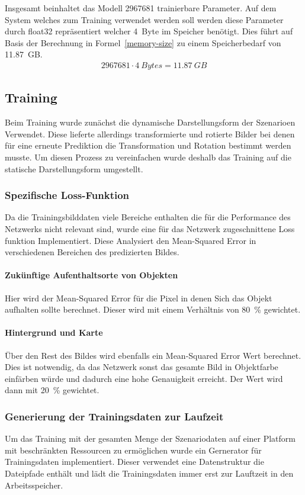 \documentclass[12pt]{article}
\begin{document}
            Insgesamt beinhaltet das Modell 2967681 trainierbare Parameter. 
            Auf dem System welches zum Training verwendet werden soll werden diese Parameter durch float32 repräsentiert welcher 4~Byte im Speicher benötigt.
            Dies führt auf Basis der Berechnung in Formel~\ref{memory-size} zu einem Speicherbedarf von 11.87~GB. 
            \begin{align}
                2967681 \cdot 4~Bytes = 11.87~GB
                \label{memory-size}
            \end{align}
    \subsection{Training}
        Beim Training wurde zunächst die dynamische Darstellungsform der Szenarioen Verwendet. 
        Diese lieferte allerdings transformierte und rotierte Bilder bei denen für eine erneute Prediktion die Transformation und Rotation bestimmt werden musste. 
        Um diesen Prozess zu vereinfachen wurde deshalb das Training auf die statische Darstellungsform umgestellt.
        \subsubsection{Spezifische Loss-Funktion}
	        Da die Trainingsbilddaten viele Bereiche enthalten die für die Performance des Netzwerks nicht relevant sind, 
            wurde eine für das Netzwerk zugeschnittene Loss funktion Implementiert. 
            Diese Analysiert den Mean-Squared Error in verschiedenen Bereichen des predizierten Bildes. 
            \paragraph{Zukünftige Aufenthaltsorte von Objekten} Hier wird der Mean-Squared Error für die Pixel in denen Sich das Objekt aufhalten sollte berechnet. 
            Dieser wird mit einem Verhältnis von 80~\% gewichtet.
            \paragraph{Hintergrund und Karte} Über den Rest des Bildes wird ebenfalls ein Mean-Squared Error Wert berechnet. 
            Dies ist notwendig, da das Netzwerk sonst das gesamte Bild in Objektfarbe einfärben würde und dadurch eine hohe Genauigkeit erreicht.
            Der Wert wird dann mit 20~\% gewichtet.
        \subsubsection{Generierung der Trainingsdaten zur Laufzeit}
            Um das Training mit der gesamten Menge der Szenariodaten auf einer Platform mit beschränkten Ressourcen zu ermöglichen wurde ein Gernerator für Trainingsdaten implementiert.
            Dieser verwendet eine Datenstruktur die Dateipfade enthält und lädt die Trainingsdaten immer erst zur Lauftzeit in den Arbeitsspeicher.
\end{document}
